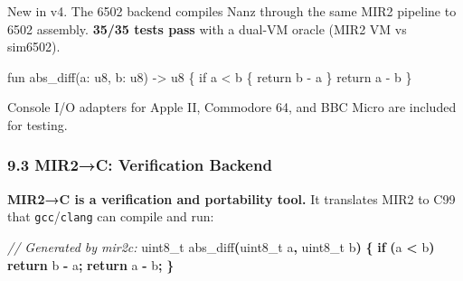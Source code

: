 \documentclass[
  11pt,
]{article}
\newenvironment{Shaded}{\begin{snugshade}}{\end{snugshade}}
\newcommand{\BaseNTok}[1]{\textcolor[rgb]{0.00,0.00,0.81}{#1}}
\newcommand{\BuiltInTok}[1]{#1}
\newcommand{\CommentTok}[1]{\textcolor[rgb]{0.56,0.35,0.01}{\textit{#1}}}
\newcommand{\ControlFlowTok}[1]{\textcolor[rgb]{0.13,0.29,0.53}{\textbf{#1}}}
\newcommand{\DataTypeTok}[1]{\textcolor[rgb]{0.13,0.29,0.53}{#1}}
\newcommand{\FunctionTok}[1]{\textcolor[rgb]{0.13,0.29,0.53}{\textbf{#1}}}
\newcommand{\NormalTok}[1]{#1}
\newcommand{\OperatorTok}[1]{\textcolor[rgb]{0.81,0.36,0.00}{\textbf{#1}}}
\begin{document}
New in v4. The 6502 backend compiles Nanz through the same MIR2 pipeline
to 6502 assembly. \textbf{35/35 tests pass} with a dual-VM oracle (MIR2
VM vs sim6502).

\begin{Shaded}
\begin{Highlighting}[]
\NormalTok{fun abs\_diff(a: u8, b: u8) {-}\textgreater{} u8 \{}
\NormalTok{    if a \textless{} b \{ return b {-} a \}}
\NormalTok{    return a {-} b}
\NormalTok{\}}
\end{Highlighting}
\end{Shaded}

\begin{Shaded}
\end{Shaded}

Console I/O adapters for Apple II, Commodore 64, and BBC Micro are
included for testing.

\hypertarget{mir2c-verification-backend}{%
\subsubsection{9.3 MIR2→C: Verification
Backend}\label{mir2c-verification-backend}}

\textbf{MIR2→C is a verification and portability tool.} It translates
MIR2 to C99 that \texttt{gcc}/\texttt{clang} can compile and run:

\begin{Shaded}
\begin{Highlighting}[]
\CommentTok{// Generated by mir2c:}
\DataTypeTok{uint8\_t}\NormalTok{ abs\_diff}\OperatorTok{(}\DataTypeTok{uint8\_t}\NormalTok{ a}\OperatorTok{,} \DataTypeTok{uint8\_t}\NormalTok{ b}\OperatorTok{)} \OperatorTok{\{}
    \ControlFlowTok{if} \OperatorTok{(}\NormalTok{a }\OperatorTok{\textless{}}\NormalTok{ b}\OperatorTok{)} \ControlFlowTok{return}\NormalTok{ b }\OperatorTok{{-}}\NormalTok{ a}\OperatorTok{;}
    \ControlFlowTok{return}\NormalTok{ a }\OperatorTok{{-}}\NormalTok{ b}\OperatorTok{;}
\OperatorTok{\}}
\end{Highlighting}
\end{Shaded}
\end{document}
